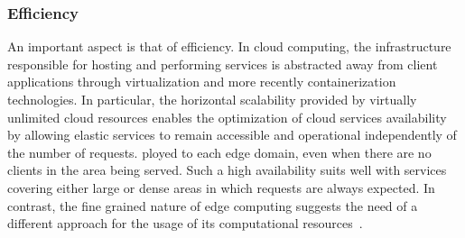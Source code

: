 
\subsubsection*{Efficiency}\label{sec:efficiency}


An important aspect is that of efficiency. In cloud computing, the infrastructure responsible for hosting and performing services is abstracted away from client applications through virtualization and more recently containerization technologies. In particular, the horizontal scalability provided by virtually unlimited cloud resources enables the optimization of cloud services availability by allowing elastic services to remain accessible and operational independently of the number of requests. ployed to each edge domain, even when there are no clients in the area being served. Such a high availability suits well with services covering either large or dense areas in which requests are always expected. In contrast, the fine grained nature of edge computing suggests the need of a different approach for the usage of its computational resources~\cite{GarrigaMendonca2017}.

